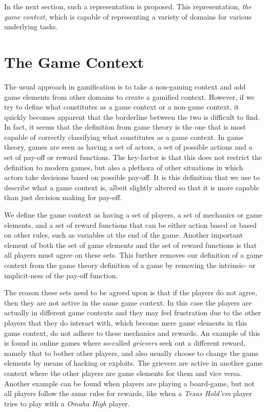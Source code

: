 \documentclass[11pt]{article}
\begin{document}
In the next section, such a representation is proposed. This representation, \emph{the game context}, which is capable of representing a variety of domains for various underlying tasks.


\section{The Game Context}
\label{sec:thegamecontext}
The usual approach in gamification is to take a non-gaming context and add game elements from other domains to create a gamified context. However, if we try to define what constitutes as a game context or a non-game context, it quickly becomes apparent that the borderline between the two is difficult to find. In fact, it seems that the definition from game theory is the one that is most capable of correctly classifying what constitutes as a game context. In game theory, games are seen as having a set of actors, a set of possible actions and a set of pay-off or reward functions. The key-factor is that this does not restrict the definition to modern games, but also a plethora of other situations in which actors take decisions based on possible pay-off. It is this definition that we use to describe what a game context is, albeit slightly altered so that it is more capable than just decision making for pay-off.

We define the game context as having a set of players, a set of mechanics or game elements, and a set of reward functions that can be either action based or based on other rules, such as variables at the end of the game. Another important element of both the set of game elements and the set of reward functions is that all players must agree on these sets. This further removes our definition of a game context from the game theory definition of a game by removing the intrinsic- or implicit-ness of the pay-off function.

The reason these sets need to be agreed upon is that if the players do not agree, then they are not active in the same game context. In this case the players are actually in different game contexts and they may feel frustration due to the other players that they do interact with, which become mere game elements in this game context, do not adhere to these mechanics and rewards. An example of this is found in online games where so-called \emph{grievers} seek out a different reward, namely that to bother other players, and also usually choose to change the game elements by means of hacking or exploits. The grievers are active in another game context where the other players are game elements for them and vice versa. Another example can be found when players are playing a board-game, but not all players follow the same rules for rewards, like when a \emph{Texas Hold'em} player tries to play with a \emph{Omaha High} player.
\end{document}
